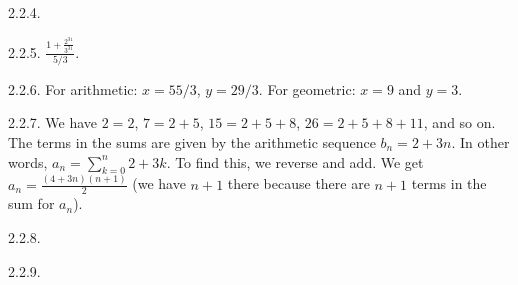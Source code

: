 \begin {itemize}
\begin{ans}{2.2.4.}
\end{ans}
\begin{ans}{2.2.5.}
		$\frac{1 + \frac{2^{31}}{3^{31}}}{5/3}$.
	
\end{ans}
\begin{ans}{2.2.6.}
		For arithmetic: $x = 55/3$, $y = 29/3$.  For geometric: $x = 9$ and $y = 3$.
	
\end{ans}
\begin{ans}{2.2.7.}
		We have $2 = 2$, $7 = 2+5$, $15 = 2 + 5 + 8$, $26 = 2+5+8+11$, and so on.  The terms in the sums are given by the arithmetic sequence $b_n = 2+3n$.  In other words, $a_n = \sum_{k=0}^n 2+3k$.  To find this, we reverse and add.  We get $a_n = \frac{(4+3n)(n+1)}{2}$ (we have $n+1$ there because there are $n+1$ terms in the sum for $a_n$).
	
\end{ans}
\begin{ans}{2.2.8.}
	
\end{ans}
\begin{ans}{2.2.9.}
\end{ans}
\end{itemize}
